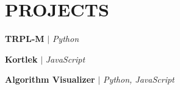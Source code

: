 \section{\textbf {\large PROJECTS}}
\resumeSubHeadingListStart

    
    \resumeProjectHeading
    {\textbf{TRPL-M} $|$ \emph{Python}}{}
    \resumeItemListStart
        \resumeItem{}
        \resumeItem{}
        \resumeItem{}
    \resumeItemListEnd

    \resumeProjectHeading
    {\textbf{Kortlek} $|$ \emph{JavaScript}}{}
    \resumeItemListStart
        \resumeItem{}
        \resumeItem{}
        \resumeItem{}
    \resumeItemListEnd

    \resumeProjectHeading
    {\textbf{Algorithm Visualizer} $|$ \emph{Python, JavaScript}}{}
    \resumeItemListStart
        \resumeItem{}
        \resumeItem{}
        \resumeItem{}
    \resumeItemListEnd

\resumeSubHeadingListEnd